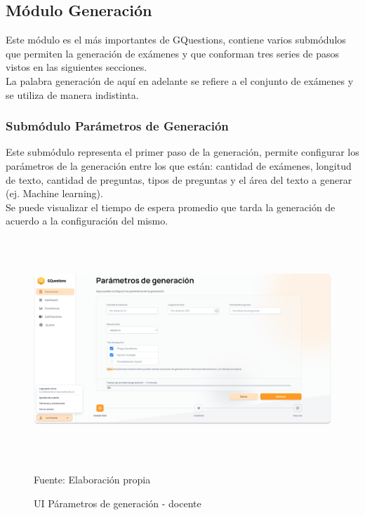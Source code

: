 \documentclass[../Main.tex]{subfiles}
\begin{document}
    \subsection{Módulo Generación}
    \begin{justify}
    Este módulo es el más importantes de GQuestions, contiene varios submódulos que permiten la generación de exámenes y que conforman tres series de pasos vistos en las siguientes secciones.\\
    La palabra generación de aquí en adelante se refiere a el conjunto de exámenes y se utiliza de manera indistinta.
    \end{justify}
    
    \subsubsection{Submódulo Parámetros de Generación}
    \begin{justify}
    Este submódulo representa el primer paso de la generación, permite configurar los parámetros de la generación entre los que están: cantidad de exámenes, longitud de texto, cantidad de preguntas, tipos de preguntas y el área del texto a generar (ej. Machine learning).\\
    Se puede visualizar el tiempo de espera promedio que tarda la generación de acuerdo a la configuración del mismo.
    \end{justify}
    
    \begin{figure}[H]
	\begin{Center}
		\includegraphics[width=6.4in,height=3.3in]{Images/ui_docente_generacion.png}
	    \caption{UI Párametros de generación - docente}
	    Fuente: Elaboración propia
        \label{fig:section}
	\end{Center}
    \end{figure}
    
\end{document}
